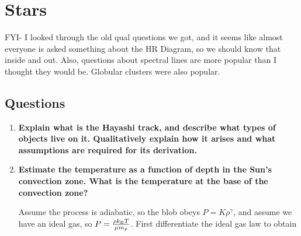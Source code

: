 \section{Stars}

FYI- I looked through the old qual questions we got, and it seems like almost everyone is asked 
something about the HR Diagram, so we should know that inside and out.  Also, questions about 
spectral lines are more popular than I thought they would be.  Globular clusters were also popular.

\subsection{Questions}
\begin{enumerate}
\item \textbf{Explain what is the Hayashi track, and describe what types of objects live on it.
      Qualitatively explain how it arises and what assumptions are required for its derivation.}

\item \textbf{Estimate the temperature as a function of depth in the Sun's convection zone. What is the temperature at the base of the convection zone?}

	Assume the process is adiabatic, so the blob obeys $P = K \rho ^\gamma$, and assume we have an ideal gas, so $P = \frac{\rho k_{\rm B} T}{\mu m_p}$. First differentiate the ideal gas law to obtain
	

\end{enumerate}
